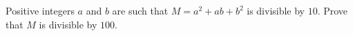 Positive integers $a$ and $b$ are such that $M=a^2+ab+b^2$ is divisible by $10$. Prove that $M$ is divisible by $100$.
